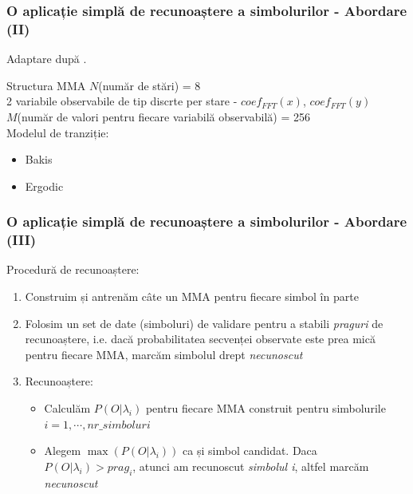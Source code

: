 \begin{frame}
	\frametitle{O aplicație simplă de recunoaștere a simbolurilor - Abordare (II)}
	Adaptare după \citep{yang1994hidden}.
	
	\begin{block}{Structura MMA}
		$N$(număr de stări) = 8\\
		2 variabile observabile de tip discrte per stare - $coef_{FFT}(x)$, $coef_{FFT}(y)$\\
		$M$(număr de valori pentru fiecare variabilă observabilă) = 256\\
		Modelul de tranziție:\\
		\begin{itemize}
			\item Bakis
			\item Ergodic
		\end{itemize}
	\end{block}
\end{frame}

\begin{frame}
	\frametitle{O aplicație simplă de recunoaștere a simbolurilor - Abordare (III)}
	
	Procedură de recunoaștere:
	\begin{enumerate}
		\item Construim și antrenăm câte un MMA pentru fiecare simbol în parte
		\vspace*{0.5em}
		\pause
		\item Folosim un set de date (simboluri) de validare pentru a stabili \emph{praguri} de recunoaștere, i.e. 
				dacă probabilitatea secvenței observate este prea mică pentru fiecare MMA, marcăm simbolul drept 
				\emph{necunoscut}
		\vspace*{0.5em}
		\pause
		\item Recunoaștere:
			\begin{itemize}
				\item Calculăm $P(O \vert \lambda_i)$ pentru fiecare MMA construit pentru simbolurile 
				$i=1,\cdots,nr\_simboluri$
				\item Alegem $\max(P(O \vert \lambda_i))$ ca și simbol candidat. 
				Daca $P(O \vert \lambda_i) > prag_i$, atunci am recunoscut \emph{simbolul i}, 
				altfel marcăm \emph{necunoscut}
			\end{itemize}
	\end{enumerate}
	
\end{frame}

